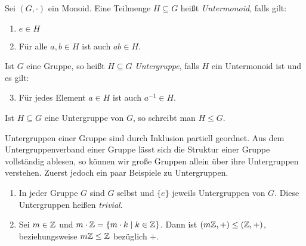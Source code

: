 {\begin{definition}\label{def:algebra:untergruppe}
  Sei $(G,\cdot)$ ein Monoid. Eine Teilmenge $H \subseteq G$ heißt \emph{Untermonoid}, falls gilt:
  \begin{enumerate}
    \item $e \in H$
    \item Für alle $a, b \in H$ ist auch $ab \in H$.
  \end{enumerate}
  Ist $G$ eine Gruppe, so heißt $H \subseteq G$ \emph{Untergruppe}, falls $H$ ein Untermonoid ist und es gilt:
  \begin{enumerate}\setcounter{enumi}{2}
    \item Für jedes Element $a \in H$ ist auch $a^{-1} \in H$.
  \end{enumerate}
\end{definition}

\begin{notation}[Untergruppe]
  Ist $H \subseteq G$ eine Untergruppe von $G$, so schreibt man $H \leq G$.
\end{notation}

Untergruppen einer Gruppe sind durch Inklusion partiell geordnet. Aus dem Untergruppenverband einer Gruppe lässt sich die Struktur einer Gruppe vollständig ablesen, so können wir große Gruppen allein über ihre Untergruppen verstehen. Zuerst jedoch ein paar Beispiele zu Untergruppen.

\begin{example}
  \leavevmode \vspace{-\baselineskip}
  \begin{enumerate}[label=\alph*)]
    \item In jeder Gruppe $G$ sind $G$ selbst und $\{e\}$ jeweils Untergruppen von $G$. Diese Untergruppen heißen \emph{trivial}.
    \item Sei $m \in \mathbb{Z}$ und $m \cdot \ZZ = \left\{m \cdot k \suchthat k \in \ZZ \right\}$. Dann ist $(m\mathbb{Z},+) \leq (\mathbb{Z},+)$, beziehungsweise $m\mathbb{Z} \leq \mathbb{Z}$ bezüglich $+$.
  \end{enumerate}
\end{example}

}
